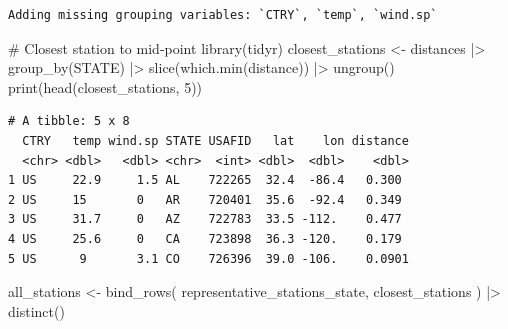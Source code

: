 \documentclass[
  letterpaper,
  DIV=11,
  numbers=noendperiod]{scrartcl}
\newenvironment{Shaded}{\begin{snugshade}}{\end{snugshade}}
\newcommand{\CommentTok}[1]{\textcolor[rgb]{0.37,0.37,0.37}{#1}}
\newcommand{\DecValTok}[1]{\textcolor[rgb]{0.68,0.00,0.00}{#1}}
\newcommand{\FunctionTok}[1]{\textcolor[rgb]{0.28,0.35,0.67}{#1}}
\newcommand{\NormalTok}[1]{\textcolor[rgb]{0.00,0.23,0.31}{#1}}
\newcommand{\OtherTok}[1]{\textcolor[rgb]{0.00,0.23,0.31}{#1}}
\newcommand{\SpecialCharTok}[1]{\textcolor[rgb]{0.37,0.37,0.37}{#1}}
\begin{document}
\begin{verbatim}
Adding missing grouping variables: `CTRY`, `temp`, `wind.sp`
\end{verbatim}

\begin{Shaded}
\begin{Highlighting}[]
\CommentTok{\# Closest station to mid{-}point}
\FunctionTok{library}\NormalTok{(tidyr)}
\NormalTok{closest\_stations }\OtherTok{\textless{}{-}}\NormalTok{ distances }\SpecialCharTok{|\textgreater{}}
\FunctionTok{group\_by}\NormalTok{(STATE) }\SpecialCharTok{|\textgreater{}}
\FunctionTok{slice}\NormalTok{(}\FunctionTok{which.min}\NormalTok{(distance)) }\SpecialCharTok{|\textgreater{}}  
\FunctionTok{ungroup}\NormalTok{()}
\FunctionTok{print}\NormalTok{(}\FunctionTok{head}\NormalTok{(closest\_stations, }\DecValTok{5}\NormalTok{)) }
\end{Highlighting}
\end{Shaded}

\begin{verbatim}
# A tibble: 5 x 8
  CTRY   temp wind.sp STATE USAFID   lat    lon distance
  <chr> <dbl>   <dbl> <chr>  <int> <dbl>  <dbl>    <dbl>
1 US     22.9     1.5 AL    722265  32.4  -86.4   0.300 
2 US     15       0   AR    720401  35.6  -92.4   0.349 
3 US     31.7     0   AZ    722783  33.5 -112.    0.477 
4 US     25.6     0   CA    723898  36.3 -120.    0.179 
5 US      9       3.1 CO    726396  39.0 -106.    0.0901
\end{verbatim}

\begin{Shaded}
\begin{Highlighting}[]
\NormalTok{all\_stations }\OtherTok{\textless{}{-}} \FunctionTok{bind\_rows}\NormalTok{(}
\NormalTok{representative\_stations\_state,}
\NormalTok{closest\_stations}
\NormalTok{) }\SpecialCharTok{|\textgreater{}}
\FunctionTok{distinct}\NormalTok{()  }
\end{Highlighting}
\end{Shaded}
\end{document}
